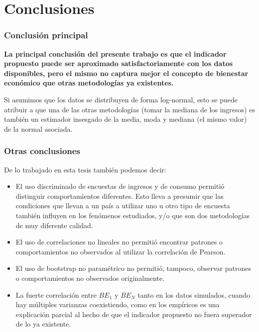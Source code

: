 \chapter{Conclusiones} \label{chapter:conclusiones}

\subsection{Conclusión principal}

\textbf{La principal conclusión del presente trabajo es que el indicador propuesto puede ser aproximado satisfactoriamente con los datos disponibles, pero el mismo no captura mejor el concepto de bienestar económico que otras metodologías ya existentes.}

Si asumimos que los datos se distribuyen de forma log-normal, esto se puede atribuir a que una de las otras metodologías (tomar la mediana de los ingresos) es también un estimador insesgado de la media, moda y mediana (el mismo valor) de la normal asociada.

\subsection{Otras conclusiones}

De lo trabajado en esta tesis también podemos decir:

\begin{itemize}
    \item El uso discriminado de encuestas de ingresos y de consumo permitió distinguir comportamientos diferentes. Esto lleva a presumir que las condiciones que llevan a un país a utilizar uno u otro tipo de encuesta también influyen en los fenómenos estudiados, y/o que son dos metodologías de muy diferente calidad.
    
    \item El uso de correlaciones no lineales no permitió encontrar patrones o comportamientos no observados al utilizar la correlación de Pearson.
    
    \item El uso de bootstrap no paramétrico no permitió, tampoco, observar patrones o comportamientos no observados originalmente.

    \item La fuerte correlación entre $BE_1$ y $BE_N$ tanto en los datos simulados, cuando hay múltiples varianzas coexistiendo, como en los empíricos es una explicación parcial al hecho de que el indicador propuesto no fuera superador de lo ya existente.
\end{itemize}

